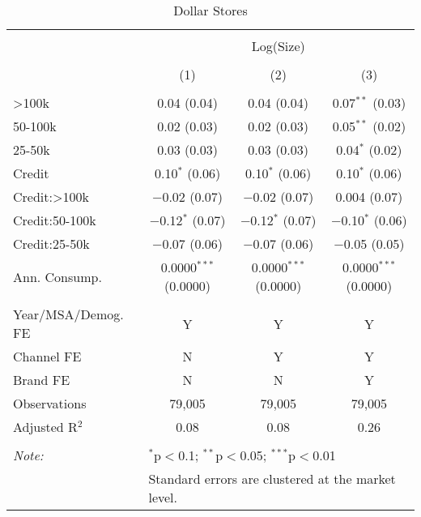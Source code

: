 
\begin{table}[!htbp] \centering 
  \caption{Dollar Stores} 
  \label{tab:packageSizeDollarSoda} 
\begin{tabular}{@{\extracolsep{5pt}}lccc} 
\\[-1.8ex]\hline 
\hline \\[-1.8ex] 
 & \multicolumn{3}{c}{Log(Size)} \\ 
\\[-1.8ex] & (1) & (2) & (3)\\ 
\hline \\[-1.8ex] 
 >100k & 0.04 (0.04) & 0.04 (0.04) & 0.07$^{**}$ (0.03) \\ 
  50-100k & 0.02 (0.03) & 0.02 (0.03) & 0.05$^{**}$ (0.02) \\ 
  25-50k & 0.03 (0.03) & 0.03 (0.03) & 0.04$^{*}$ (0.02) \\ 
  Credit & 0.10$^{*}$ (0.06) & 0.10$^{*}$ (0.06) & 0.10$^{*}$ (0.06) \\ 
  Credit:>100k & $-$0.02 (0.07) & $-$0.02 (0.07) & 0.004 (0.07) \\ 
  Credit:50-100k & $-$0.12$^{*}$ (0.07) & $-$0.12$^{*}$ (0.07) & $-$0.10$^{*}$ (0.06) \\ 
  Credit:25-50k & $-$0.07 (0.06) & $-$0.07 (0.06) & $-$0.05 (0.05) \\ 
  Ann. Consump. & 0.0000$^{***}$ (0.0000) & 0.0000$^{***}$ (0.0000) & 0.0000$^{***}$ (0.0000) \\ 
 \hline \\[-1.8ex] 
Year/MSA/Demog. FE & Y & Y & Y \\ 
Channel FE & N & Y & Y \\ 
Brand FE & N & N & Y \\ 
Observations & 79,005 & 79,005 & 79,005 \\ 
Adjusted R$^{2}$ & 0.08 & 0.08 & 0.26 \\ 
\hline 
\hline \\[-1.8ex] 
\textit{Note:}  & \multicolumn{3}{l}{$^{*}$p$<$0.1; $^{**}$p$<$0.05; $^{***}$p$<$0.01} \\ 
 & \multicolumn{3}{l}{Standard errors are clustered at the market level.} \\ 
\end{tabular} 
\end{table} 
